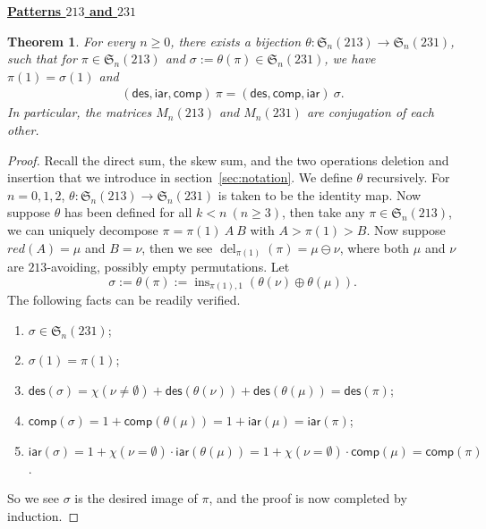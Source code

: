 \documentclass[12pt]{amsart}
\numberwithin{equation}{section}
\theoremstyle{plain}
\newtheorem{theorem}{Theorem}[section]
\theoremstyle{definition}
\def\des{\mathsf{des}}
\def\S{\mathfrak{S}}
\def\iar{\mathsf{iar}}
\def\comp{\mathsf{comp}}
\def\del{\operatorname{del}}
\def\ins{\operatorname{ins}}
\begin{document}
\noindent \underline{\bf Patterns $213$ and $231$}
\medskip

\begin{theorem}\label{thm:213-231-conjugate}
For every $n\ge 0$, there exists a bijection $\theta:\S_n(213)\rightarrow\S_n(231)$, such that for $\pi\in\S_n(213)$ and $\sigma:=\theta(\pi)\in\S_n(231)$, we have $\pi(1)=\sigma(1)$ and 
\begin{align*}
(\des,\iar,\comp)\:\pi = (\des,\comp,\iar)\:\sigma.
\end{align*}
In particular, the matrices $M_n(213)$ and $M_n(231)$ are conjugation of each other.
\end{theorem}
\begin{proof}
Recall the direct sum, the skew sum, and the two operations deletion and insertion that we introduce in section~\ref{sec:notation}. We define $\theta$ recursively. For $n=0,1,2$, $\theta:\S_n(213)\rightarrow\S_n(231)$ is taken to be the identity map. Now suppose $\theta$ has been defined for all $k < n~(n\ge 3)$, then take any $\pi\in\S_n(213)$, we can uniquely decompose $\pi=\pi(1)\:A\:B$ with $A>\pi(1)>B$. Now suppose $red(A)=\mu$ and $B=\nu$, then we see $\del_{\pi(1)}(\pi)=\mu\ominus\nu$, where both $\mu$ and $\nu$ are $213$-avoiding, possibly empty permutations. Let
$$\sigma:=\theta(\pi):=\ins_{\pi(1),1}(\theta(\nu)\oplus\theta(\mu)).$$
The following facts can be readily verified.
\begin{enumerate}
	\item $\sigma\in\S_n(231)$;
	\item $\sigma(1)=\pi(1)$;
	\item $\des(\sigma)=\chi(\nu\neq\emptyset)+\des(\theta(\nu))+\des(\theta(\mu))=\des(\pi)$;
	\item $\comp(\sigma)=1+\comp(\theta(\mu))=1+\iar(\mu)=\iar(\pi)$;
	\item $\iar(\sigma)=1+\chi(\nu=\emptyset)\cdot\iar(\theta(\mu))=1+\chi(\nu=\emptyset)\cdot\comp(\mu)=\comp(\pi)$.
\end{enumerate}
So we see $\sigma$ is the desired image of $\pi$, and the proof is now completed by induction.
\end{proof}
\end{document}
